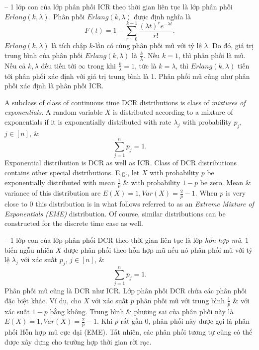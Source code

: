 \documentclass{article}
\begin{document}
\begin{itemize}
\begin{itemize}
        -- 1 lớp con của lớp phân phối ICR theo thời gian liên tục là lớp phân phối $Erlang(k,\lambda)$. Phân phối $Erlang(k,\lambda)$ được định nghĩa là
        \begin{equation*}
            F(t) = 1 - \sum_{r=0}^{k-1} \frac{(\lambda t)^re^{-\lambda t}}{r!}.
        \end{equation*}
        $Erlang(k,\lambda)$ là tích chập $k$-lần có cùng phân phối mũ với tỷ lệ $\lambda$. Do đó, giá trị trung bình của phân phối $Erlang(k,\lambda)$ là $\frac{k}{\lambda}$. Nếu $k = 1$, thì phân phối là mũ. Nếu cả $k,\lambda$ đều tiến tới $\infty$ trong khi $\frac{k}{\lambda} = 1$, tức là $k = \lambda$, thì $Erlang(k,\lambda)$ tiến tới phân phối xác định với giá trị trung bình là 1. Phân phối mũ cũng như phân phối xác định là phân phối ICR.

        A subclass of class of continuous time DCR distributions is class of {\it mixtures of exponentials}. A random variable $X$ is distributed according to a mixture of exponentials if it is exponentially distributed with rate $\lambda_j$ with probability $p_j$, $j\in[n]$, \&
        \begin{equation*}
            \sum_{j=1}^n p_j = 1.
        \end{equation*}
        Exponential distribution is DCR as well as ICR. Class of DCR distributions contains other special distributions. E.g., let $X$ with probability $p$ be exponentially distributed with mean $\frac{1}{p}$ \& with probability $1 - p$ be zero. Mean \& variance of this distribution are $E(X) = 1,Var(X) = \frac{2}{p} - 1$. When $p$ is very close to 0 this distribution is in what follows referred to as an {\it Extreme Mixture of Exponentials (EME)} distribution. Of course, similar distributions can be constructed for the discrete time case
        as well.

        -- 1 lớp con của lớp phân phối DCR theo thời gian liên tục là lớp {\it hỗn hợp mũ}. 1 biến ngẫu nhiên $X$ được phân phối theo hỗn hợp mũ nếu nó phân phối mũ với tỷ lệ $\lambda_j$ với xác suất $p_j$, $j\in[n]$, \&
        \begin{equation*}
            \sum_{j=1}^n p_j = 1.
        \end{equation*}
        Phân phối mũ cũng là DCR như ICR. Lớp phân phối DCR chứa các phân phối đặc biệt khác. Ví dụ, cho $X$ với xác suất $p$ phân phối mũ với trung bình $\frac{1}{p}$ \& với xác suất $1 - p$ bằng không. Trung bình \& phương sai của phân phối này là $E(X) = 1, Var(X) = \frac{2}{p} - 1$. Khi $p$ rất gần 0, phân phối này được gọi là phân phối Hỗn hợp mũ cực đại (EME). Tất nhiên, các phân phối tương tự cũng có thể được xây dựng cho trường hợp thời gian rời rạc.


\end{itemize}
\end{itemize}
\end{document}
